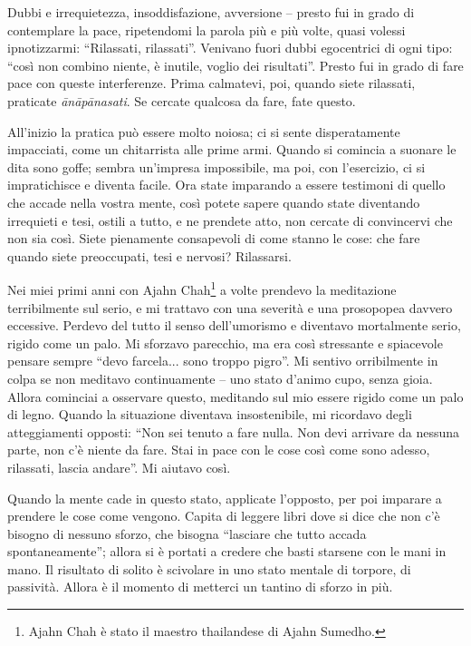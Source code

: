Dubbi e irrequietezza, insoddisfazione, avversione – presto fui in grado
di contemplare la pace, ripetendomi la parola più e più volte, quasi
volessi ipnotizzarmi: ``Rilassati, rilassati''. Venivano fuori dubbi
egocentrici di ogni tipo: ``così non combino niente, è inutile, voglio
dei risultati''. Presto fui in grado di fare pace con queste
interferenze. Prima calmatevi, poi, quando siete rilassati, praticate
\textit{ānāpānasati}. Se cercate qualcosa da fare, fate questo.

All'inizio la pratica può essere molto noiosa; ci si sente
disperatamente impacciati, come un chitarrista alle prime armi. Quando
si comincia a suonare le dita sono goffe; sembra un'impresa impossibile,
ma poi, con l'esercizio, ci si impratichisce e diventa facile. Ora state
imparando a essere testimoni di quello che accade nella vostra mente,
così potete sapere quando state diventando irrequieti e tesi, ostili a
tutto, e ne prendete atto, non cercate di convincervi che non sia così.
Siete pienamente consapevoli di come stanno le cose: che fare quando
siete preoccupati, tesi e nervosi? Rilassarsi.

Nei miei primi anni con Ajahn Chah\footnote{Ajahn Chah è stato il maestro thailandese di Ajahn
Sumedho.} a volte prendevo la
meditazione terribilmente sul serio, e mi trattavo con una severità e
una prosopopea davvero eccessive. Perdevo del tutto il senso
dell'umorismo e diventavo mortalmente serio, rigido come un palo. Mi
sforzavo parecchio, ma era così stressante e spiacevole pensare sempre
``devo farcela... sono troppo pigro''. Mi sentivo orribilmente in colpa se
non meditavo continuamente – uno stato d'animo cupo, senza gioia. Allora
cominciai a osservare questo, meditando sul mio essere rigido come un
palo di legno. Quando la situazione diventava insostenibile, mi
ricordavo degli atteggiamenti opposti: ``Non sei tenuto a fare nulla. Non
devi arrivare da nessuna parte, non c'è niente da fare. Stai in pace con
le cose così come sono adesso, rilassati, lascia andare''. Mi aiutavo
così.

Quando la mente cade in questo stato, applicate l'opposto, per poi
imparare a prendere le cose come vengono. Capita di leggere libri dove
si dice che non c'è bisogno di nessuno sforzo, che bisogna ``lasciare che
tutto accada spontaneamente''; allora si è portati a credere che basti
starsene con le mani in mano. Il risultato di solito è scivolare in uno
stato mentale di torpore, di passività. Allora è il momento di metterci
un tantino di sforzo in più.

